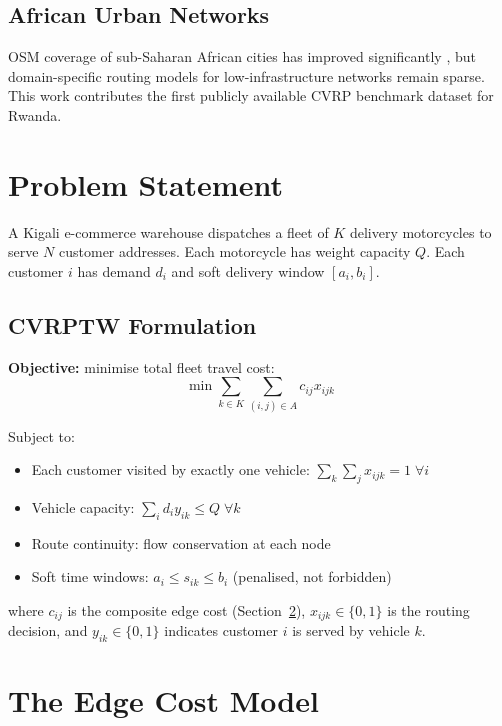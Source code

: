 \documentclass[12pt, a4paper]{article}
\begin{document}
\subsection{African Urban Networks}
OSM coverage of sub-Saharan African cities has improved significantly
\cite{jonathanBarringtonLeigh2017}, but domain-specific routing models for
low-infrastructure networks remain sparse. This work contributes the first
publicly available CVRP benchmark dataset for Rwanda.

\section{Problem Statement}
\label{sec:problem}

A Kigali e-commerce warehouse dispatches a fleet of $K$ delivery motorcycles
to serve $N$ customer addresses. Each motorcycle has weight capacity $Q$.
Each customer $i$ has demand $d_i$ and soft delivery window $[a_i, b_i]$.

\subsection{CVRPTW Formulation}

\textbf{Objective:} minimise total fleet travel cost:
\[
  \min \sum_{k \in K} \sum_{(i,j) \in A} c_{ij} x_{ijk}
\]

\noindent Subject to:
\begin{itemize}
  \item Each customer visited by exactly one vehicle: $\sum_k \sum_j x_{ijk} = 1 \;\forall i$
  \item Vehicle capacity: $\sum_i d_i y_{ik} \leq Q \;\forall k$
  \item Route continuity: flow conservation at each node
  \item Soft time windows: $a_i \leq s_{ik} \leq b_i$ (penalised, not forbidden)
\end{itemize}

where $c_{ij}$ is the composite edge cost (Section~\ref{sec:model}),
$x_{ijk} \in \{0,1\}$ is the routing decision, and $y_{ik} \in \{0,1\}$
indicates customer $i$ is served by vehicle $k$.

\section{The Edge Cost Model}
\label{sec:model}
\end{document}
